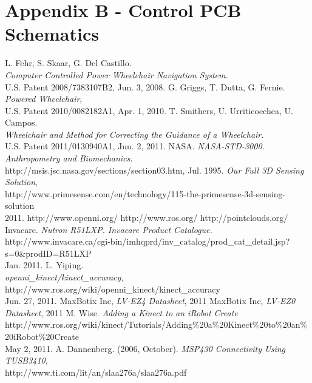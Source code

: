 \documentclass[oneside,final,a4paper]{report}
\begin{document}
\chapter*{Appendix B - Control PCB Schematics}

\begin{thebibliography}{9}
  L. Fehr, S. Skaar, G. Del Castillo. \\
  \emph{Computer Controlled Power Wheelchair Navigation System.} \\
  U.S. Patent 2008/7383107B2, Jun. 3, 2008.
  G. Griggs, T. Dutta, G. Fernie. \emph{Powered Wheelchair},\\
  U.S. Patent 2010/0082182A1, Apr. 1, 2010.
  T. Smithers, U. Urriticoechea, U. Campos. \\
  \emph{Wheelchair and Method for Correcting the Guidance of a Wheelchair.} \\
  U.S. Patent 2011/0130940A1, Jun. 2, 2011.
  NASA. \emph{NASA-STD-3000. Anthropometry and Biomechanics.}\\
  http://msis.jsc.nasa.gov/sections/section03.htm, Jul. 1995.
  \emph{Our Full 3D Sensing Solution}, \\
  \mbox{http://www.primesense.com/en/technology/115-the-primesense-3d-sensing-solution} \\
  2011.
  http://www.openni.org/
  http://www.ros.org/
  http://pointclouds.org/
  Invacare. \emph{Nutron R51LXP. Invacare Product Catalogue.} \\
  http://www.invacare.ca/cgi-bin/imhqprd/inv\_catalog/prod\_cat\_detail.jsp?s=0\&prodID=R51LXP\\
 Jan. 2011.
  L. Yiping. \\
  \emph{openni\_kinect/kinect\_accuracy}, http://www.ros.org/wiki/openni\_kinect/kinect\_accuracy\\
  Jun. 27, 2011.
  MaxBotix Inc, \emph{LV-EZ4 Datasheet},  2011
  MaxBotix Inc, \emph{LV-EZ0 Datasheet},  2011
  M. Wise.  \emph{Adding a Kinect to an iRobot Create} \\
  http://www.ros.org/wiki/kinect/Tutorials/Adding\%20a\%20Kinect\%20to\%20an\%20iRobot\%20Create\\
  May 2, 2011.
  A. Dannenberg. (2006, October). \emph{MSP430 Connectivity Using TUSB3410},\\
  http://www.ti.com/lit/an/slaa276a/slaa276a.pdf
\end{thebibliography}
\end{document}
